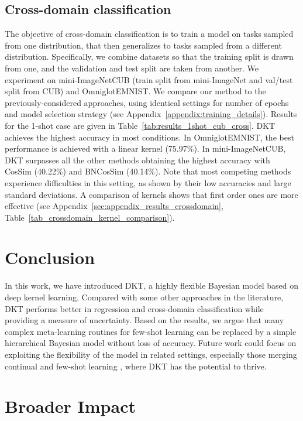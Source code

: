 \documentclass{article}
\begin{document}
\subsection{Cross-domain classification}
The objective of cross-domain classification is to train a model on tasks sampled from one distribution, that then generalizes to tasks sampled from a different distribution. Specifically, we combine datasets so that the training split is drawn from one, and the validation and test split are taken from another. We experiment on mini-ImageNetCUB (train split from mini-ImageNet and val/test split from CUB) and OmniglotEMNIST. We compare our method to the previously-considered approaches, using identical settings for number of epochs and model selection strategy (see Appendix~\ref{appendix:training_details}).
Results for the 1-shot case are given in Table~\ref{tab:results_1shot_cub_cross}. DKT achieves the highest accuracy in most conditions. In OmniglotEMNIST, the best performance is achieved with a linear kernel (75.97\%). In mini-ImageNetCUB, DKT surpasses all the other methods obtaining the highest accuracy with CosSim (40.22\%) and BNCosSim (40.14\%). Note that most competing methods experience difficulties in this setting, as shown by their low accuracies and large standard deviations. A comparison of kernels shows that first order ones are more effective (see Appendix~\ref{sec:appendix_results_crossdomain}, Table~\ref{tab_crossdomain_kernel_comparison}).


\section{Conclusion}
In this work, we have introduced DKT, a highly flexible Bayesian model based on deep kernel learning. Compared with some other approaches in the literature, DKT performs better in regression and cross-domain classification while providing a measure of uncertainty. Based on the results, we argue that many complex meta-learning routines for few-shot learning can be replaced by a simple hierarchical Bayesian model without loss of accuracy. Future work could focus on exploiting the flexibility of the model in related settings, especially those merging continual and few-shot learning \citep{antoniou2020defining}, where DKT has the potential to thrive.

\FloatBarrier
\section*{Broader Impact}
\end{document}
